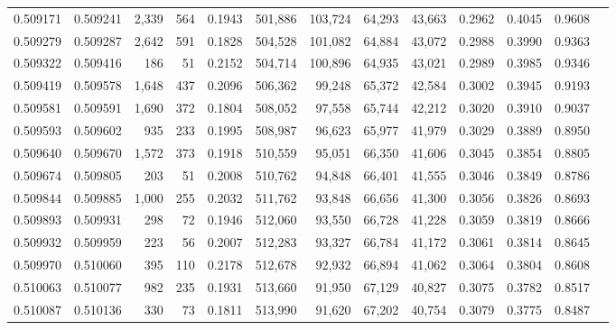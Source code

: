 \begin{tabular}{rrrrrrrrrrrrr}
0.509171 & 0.509241 & 2,339 &   564 &                                     0.1943 & 501,886 & 103,724 &  64,293 &  43,663 & 0.2962 & 0.4045 & 0.9608 \\
0.509279 & 0.509287 & 2,642 &   591 &                                     0.1828 & 504,528 & 101,082 &  64,884 &  43,072 & 0.2988 & 0.3990 & 0.9363 \\
0.509322 & 0.509416 &   186 &    51 &                                     0.2152 & 504,714 & 100,896 &  64,935 &  43,021 & 0.2989 & 0.3985 & 0.9346 \\
0.509419 & 0.509578 & 1,648 &   437 &                                     0.2096 & 506,362 &  99,248 &  65,372 &  42,584 & 0.3002 & 0.3945 & 0.9193 \\
0.509581 & 0.509591 & 1,690 &   372 &                                     0.1804 & 508,052 &  97,558 &  65,744 &  42,212 & 0.3020 & 0.3910 & 0.9037 \\
0.509593 & 0.509602 &   935 &   233 &                                     0.1995 & 508,987 &  96,623 &  65,977 &  41,979 & 0.3029 & 0.3889 & 0.8950 \\
0.509640 & 0.509670 & 1,572 &   373 &                                     0.1918 & 510,559 &  95,051 &  66,350 &  41,606 & 0.3045 & 0.3854 & 0.8805 \\
0.509674 & 0.509805 &   203 &    51 &                                     0.2008 & 510,762 &  94,848 &  66,401 &  41,555 & 0.3046 & 0.3849 & 0.8786 \\
0.509844 & 0.509885 & 1,000 &   255 &                                     0.2032 & 511,762 &  93,848 &  66,656 &  41,300 & 0.3056 & 0.3826 & 0.8693 \\
0.509893 & 0.509931 &   298 &    72 &                                     0.1946 & 512,060 &  93,550 &  66,728 &  41,228 & 0.3059 & 0.3819 & 0.8666 \\
0.509932 & 0.509959 &   223 &    56 &                                     0.2007 & 512,283 &  93,327 &  66,784 &  41,172 & 0.3061 & 0.3814 & 0.8645 \\
0.509970 & 0.510060 &   395 &   110 &                                     0.2178 & 512,678 &  92,932 &  66,894 &  41,062 & 0.3064 & 0.3804 & 0.8608 \\
0.510063 & 0.510077 &   982 &   235 &                                     0.1931 & 513,660 &  91,950 &  67,129 &  40,827 & 0.3075 & 0.3782 & 0.8517 \\
0.510087 & 0.510136 &   330 &    73 &                                     0.1811 & 513,990 &  91,620 &  67,202 &  40,754 & 0.3079 & 0.3775 & 0.8487 \\

\end{tabular}
